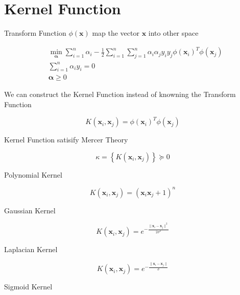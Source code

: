 \documentclass[a4paper,12pt]{article}
\begin{document}
    \section{Kernel Function}

        Transform Function $\phi(\bm{x})$ map the vector $\bm{x}$ into other space

        \begin{equation}
            \begin{split}
                & \min_{\bm{\alpha}} \sum_{i=1}^n\alpha_i-\frac{1}{2}\sum_{i=1}^n\sum_{j=1}^n\alpha_i\alpha_jy_iy_j\phi(\bm{x}_i)^T\phi(\bm{x}_j)\\
                & \sum_{i=1}^n\alpha_iy_i=0\\
                & \bm{\alpha}\geq 0
            \end{split}
        \end{equation}

        We can construct the Kernel Function instead of knowning the Transform Function

        \begin{equation}
            K(\bm{x}_i,\bm{x}_j)=\phi(\bm{x}_i)^T\phi(\bm{x}_j)
        \end{equation}

        Kernel Function satisify Mercer Theory

        \begin{equation}
            \kappa=\left\lbrace K(\bm{x}_i,\bm{x}_j) \right\rbrace \succeq 0
        \end{equation}

        Polynomial Kernel

        \begin{equation}
            K(\bm{x}_i,\bm{x}_j)=(\bm{x}_i\bm{x}_j+1)^n
        \end{equation}

        Gaussian Kernel

        \begin{equation}
            K(\bm{x}_i,\bm{x}_j)=e^{-\frac{\|\bm{x}_i-\bm{x}_j\|^2}{2\sigma^2}}
        \end{equation}

        Laplacian Kernel

        \begin{equation}
            K(\bm{x}_i,\bm{x}_j)=e^{-\frac{\|\bm{x}_i-\bm{x}_j\|}{\sigma}}
        \end{equation}

        Sigmoid Kernel
\end{document}
